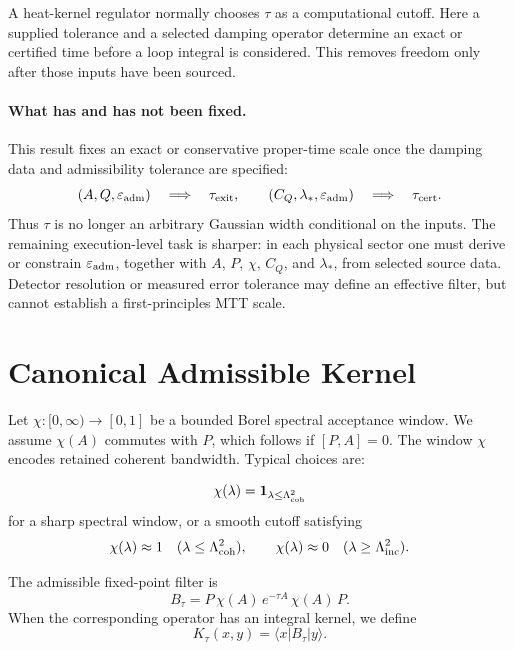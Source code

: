 \documentclass[11pt]{article}
\begin{document}
\begin{remark}
A heat-kernel regulator normally chooses \(\tau\) as a computational cutoff. Here a supplied
tolerance and a selected damping operator determine an exact or certified time before a loop
integral is considered. This removes freedom only after those inputs have been sourced.
\end{remark}


\paragraph{What has and has not been fixed.}
This result fixes an exact or conservative proper-time scale once the damping data and admissibility tolerance are specified:
\[
(A,Q,\varepsilon_{\rm adm})\quad\Longrightarrow\quad \tau_{\rm exit},
\qquad
(C_Q,\lambda_\ast,\varepsilon_{\rm adm})\quad\Longrightarrow\quad \tau_{\rm cert}.
\]
Thus \(\tau\) is no longer an arbitrary Gaussian width conditional on the inputs. The remaining execution-level task is sharper: in each physical sector one must derive or constrain \(\varepsilon_{\rm adm}\), together with \(A\), \(P\), \(\chi\), \(C_Q\), and \(\lambda_\ast\), from selected source data. Detector resolution or measured error tolerance may define an effective filter, but cannot establish a first-principles MTT scale.

\section{Canonical Admissible Kernel}

Let \(\chi:[0,\infty)\to[0,1]\) be a bounded Borel spectral acceptance window. We assume \(\chi(A)\) commutes with \(P\), which follows if \([P,A]=0\). The window \(\chi\) encodes retained coherent bandwidth. Typical choices are:

\[
\chi(\lambda)=\mathbf 1_{\lambda\le\Lambda_{\rm coh}^2}
\]
for a sharp spectral window, or a smooth cutoff satisfying
\[
\chi(\lambda)\approx1 \quad (\lambda\le\Lambda_{\rm coh}^2),
\qquad
\chi(\lambda)\approx0 \quad (\lambda\ge\Lambda_{\rm inc}^2).
\]

\begin{definition}
The admissible fixed-point filter is
\[
B_{\tau}
=
P\,\chi(A)\,e^{-\tau A}\,\chi(A)\,P .
\]
When the corresponding operator has an integral kernel, we define
\[
\boxed{
K_{\tau}(x,y)
=
\langle x|B_{\tau}|y\rangle .
}
\]
\end{definition}
\end{document}
